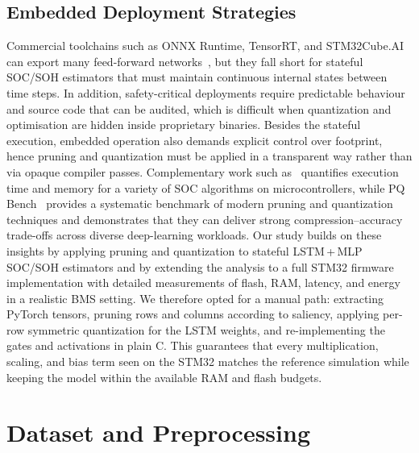 \documentclass[final,3p,times]{elsarticle}
\begin{document}
\subsection{Embedded Deployment Strategies}
Commercial toolchains such as ONNX Runtime, TensorRT, and STM32Cube.AI can export many feed-forward networks~\cite{ONNXRuntimeHighperformance,NVIDIATensorRTHighPerformance,XCUBEAISTM32CubeExpansion}, but they fall short for stateful SOC/SOH estimators that must maintain continuous internal states between time steps. In addition, safety-critical deployments require predictable behaviour and source code that can be audited, which is difficult when quantization and optimisation are hidden inside proprietary binaries. Besides the stateful execution, embedded operation also demands explicit control over footprint, hence pruning and quantization must be applied in a transparent way rather than via opaque compiler passes. Complementary work such as~\cite{naguibMicroprocessorExecutionTime2022} quantifies execution time and memory for a variety of SOC algorithms on microcontrollers, while PQ Bench~\cite{schulzePQBenchBenchmarking2025} provides a systematic benchmark of modern pruning and quantization techniques and demonstrates that they can deliver strong compression--accuracy trade-offs across diverse deep-learning workloads. Our study builds on these insights by applying pruning and quantization to stateful LSTM\,+\,MLP SOC/SOH estimators and by extending the analysis to a full STM32 firmware implementation with detailed measurements of flash, RAM, latency, and energy in a realistic BMS setting. We therefore opted for a manual path: extracting PyTorch tensors, pruning rows and columns according to saliency, applying per-row symmetric quantization for the LSTM weights, and re-implementing the gates and activations in plain C. This guarantees that every multiplication, scaling, and bias term seen on the STM32 matches the reference simulation while keeping the model within the available RAM and flash budgets.
\section{Dataset and Preprocessing}
\end{document}
